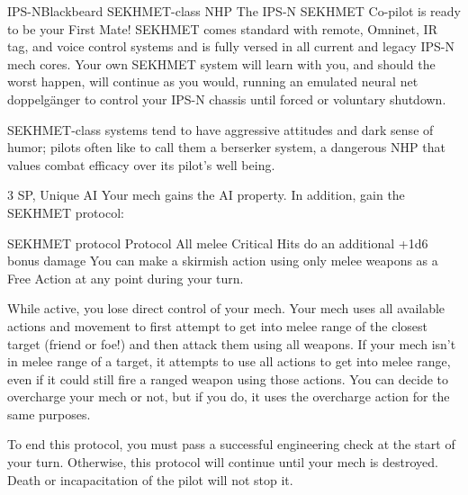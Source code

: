\begin{mech}{IPS-N}{Blackbeard}
SEKHMET-class NHP
The IPS-N SEKHMET Co-pilot is ready to be your First Mate! SEKHMET comes standard with remote, Omninet, IR tag, and voice control systems and is fully versed in all current and legacy IPS-N mech cores. Your own SEKHMET system will learn with you, and should the worst happen, will continue as you would, running an emulated neural net doppelgänger to control your IPS-N chassis until forced or voluntary shutdown.

SEKHMET-class systems tend to have aggressive attitudes and dark sense of humor; pilots often like to call them a berserker system, a dangerous NHP that values combat efficacy over its pilot’s well being.

3 SP, Unique
AI
Your mech gains the AI property. In addition, gain the SEKHMET protocol:

SEKHMET protocol
Protocol
All melee Critical Hits do an additional +1d6 bonus damage
You can make a skirmish action using only melee weapons as a Free Action at any point during your turn.

While active, you lose direct control of your mech. Your mech uses all available actions and movement to first attempt to get into melee range of the closest target (friend or foe!) and then attack them using all weapons. If your mech isn’t in melee range of a target, it attempts to use all actions to get into melee range, even if it could still fire a ranged weapon using those actions. You can decide to overcharge your mech or not, but if you do, it uses the overcharge action for the same purposes.

To end this protocol, you must pass a successful engineering check at the start of your turn. Otherwise, this protocol will continue until your mech is destroyed. Death or incapacitation of the pilot will not stop it.


\end{mech}
